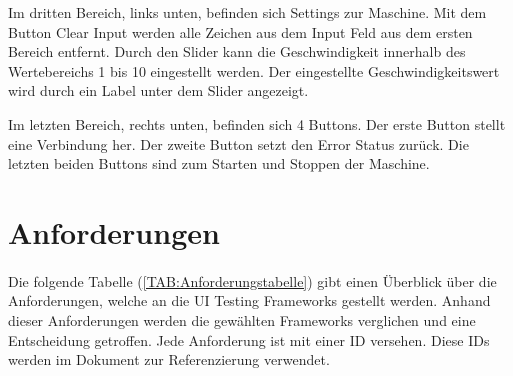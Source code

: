 		Im dritten Bereich, links unten, befinden sich Settings zur Maschine. Mit dem Button Clear Input werden alle Zeichen aus dem  Input Feld aus dem ersten Bereich entfernt. Durch den Slider kann die Geschwindigkeit innerhalb des Wertebereichs 1 bis 10 eingestellt werden. Der eingestellte Geschwindigkeitswert wird durch ein Label unter dem Slider angezeigt.
		
		Im letzten Bereich, rechts unten, befinden sich 4 Buttons. Der erste Button stellt eine Verbindung her. Der zweite Button setzt den Error Status zurück. Die letzten beiden Buttons sind zum Starten und Stoppen der Maschine.
		 
		 \newpage
	\section{Anforderungen}
		\paragraph{} Die folgende Tabelle (\ref{TAB:Anforderungstabelle}) gibt einen Überblick über die Anforderungen, welche an die UI Testing Frameworks gestellt werden. Anhand dieser Anforderungen werden die gewählten Frameworks verglichen und eine Entscheidung getroffen. Jede Anforderung ist mit einer ID versehen. Diese IDs werden im Dokument zur Referenzierung verwendet.
					
